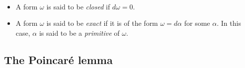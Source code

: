 \documentclass[11pt]{amsart}
\begin{document}
\begin{terminology} \,
\begin{itemize}
    \item A form $\omega$ is said to be \emph{closed} if $d\omega = 0$.
    \item A form $\omega$ is said to be \emph{exact} if it is of the form $\omega=d\alpha$ for some $\alpha$. In this case, $\alpha$ is said to be a \emph{primitive} of $\omega$.
\end{itemize}
\end{terminology}

\subsection{The Poincar\'e lemma}


\end{document}
